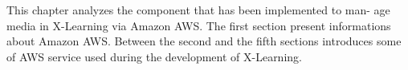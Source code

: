 This chapter analyzes the component that has been implemented to man- age media in X-Learning via Amazon AWS. The first section present informations about Amazon AWS. Between the second and the fifth sections introduces some of AWS service used during the development of  X-Learning.
